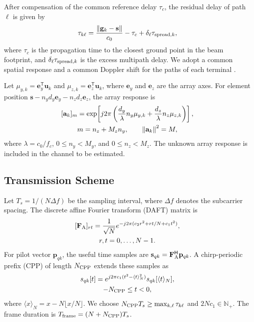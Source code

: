 After compensation of the common reference delay $\tau_c$, the residual
delay of path $\ell$ is given by
\begin{equation}
 \tau_{k\ell}=\frac{\left\lVert\mathbf{g}_k-\mathbf{s}\right\rVert}{c_0}-\tau_c
             +\delta_\ell\tau_{{\rm spread},k},
 \label{eq:path-delay}
\end{equation}
where $\tau_c$ is the propagation time to the closest ground point in the
beam footprint, and $\delta_\ell\tau_{{\rm spread},k}$ is the excess
multipath delay. We adopt a common spatial response and a common Doppler
shift for the paths of each terminal
\cite{li2023}\cite{huang2026}.

Let $\mu_{y,k}=\mathbf e_y^{\mathsf T}\mathbf u_k$ and
$\mu_{z,k}=\mathbf e_z^{\mathsf T}\mathbf u_k$, where $\mathbf e_y$ and
$\mathbf e_z$ are the array axes. For element position
$\mathbf s-n_yd_y\mathbf e_y-n_zd_z\mathbf e_z$, the array response is
\begin{equation}
 \begin{gathered}
 [\mathbf{a}_k]_m=
 \exp\!\left[j2\pi\left(
 \frac{d_y}{\lambda}n_y\mu_{y,k}
 +\frac{d_z}{\lambda}n_z\mu_{z,k}\right)\right],\\
 m=n_z+M_zn_y,\qquad \norm{\mathbf{a}_k}^2=M,
 \end{gathered}
 \label{eq:upa}
\end{equation}
where $\lambda=c_0/f_c$, $0\leq n_y<M_y$, and $0\leq n_z<M_z$.
The unknown array response is included in the channel to be estimated.

\subsection{Transmission Scheme}

Let $T_s=1/(N\Delta f)$ be the sampling interval, where $\Delta f$
denotes the subcarrier spacing. The discrete affine Fourier transform
(DAFT) matrix is \cite{bemani2022}
\begin{equation}
 \begin{gathered}
 [\mathbf{F}_{\rm A}]_{rt}=\frac{1}{\sqrt N}
 e^{-j2\pi(c_2r^2+rt/N+c_1t^2)},\\
 r,t=0,\ldots,N-1.
 \end{gathered}
 \label{eq:daft}
\end{equation}
For pilot vector $\mathbf p_{qk}$, the useful time samples are
$\mathbf s_{qk}=\mathbf F_{\rm A}^{\mathsf H}\mathbf p_{qk}$.
A chirp-periodic prefix (CPP) of length $N_{\rm CPP}$ extends these samples as
\begin{equation}
 \begin{gathered}
 s_{qk}[t]=e^{j2\pi c_1(t^2-\langle t\rangle_N^2)}
 s_{qk}[\langle t\rangle_N],\\
 -N_{\rm CPP}\leq t<0,
 \end{gathered}
 \label{eq:cpp}
\end{equation}
where $\langle x\rangle_N=x-N\lfloor x/N\rfloor$.
We choose $N_{\rm CPP}T_s\geq\max_{k,\ell}\tau_{k\ell}$ and
$2Nc_1\in\mathbb N_+$. The frame duration is
$T_{\rm frame}=(N+N_{\rm CPP})T_s$.

